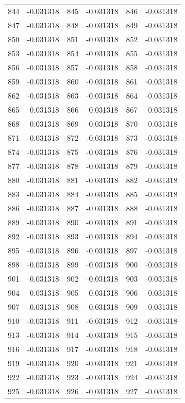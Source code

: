 \documentclass[12pt]{article}
\begin{document}
\begin{longtable}{@{}cc|cc|cc@{}}
844 & -0.031318 & 845 & -0.031318 & 846 & -0.031318 \\
847 & -0.031318 & 848 & -0.031318 & 849 & -0.031318 \\
850 & -0.031318 & 851 & -0.031318 & 852 & -0.031318 \\
853 & -0.031318 & 854 & -0.031318 & 855 & -0.031318 \\
856 & -0.031318 & 857 & -0.031318 & 858 & -0.031318 \\
859 & -0.031318 & 860 & -0.031318 & 861 & -0.031318 \\
862 & -0.031318 & 863 & -0.031318 & 864 & -0.031318 \\
865 & -0.031318 & 866 & -0.031318 & 867 & -0.031318 \\
868 & -0.031318 & 869 & -0.031318 & 870 & -0.031318 \\
871 & -0.031318 & 872 & -0.031318 & 873 & -0.031318 \\
874 & -0.031318 & 875 & -0.031318 & 876 & -0.031318 \\
877 & -0.031318 & 878 & -0.031318 & 879 & -0.031318 \\
880 & -0.031318 & 881 & -0.031318 & 882 & -0.031318 \\
883 & -0.031318 & 884 & -0.031318 & 885 & -0.031318 \\
886 & -0.031318 & 887 & -0.031318 & 888 & -0.031318 \\
889 & -0.031318 & 890 & -0.031318 & 891 & -0.031318 \\
892 & -0.031318 & 893 & -0.031318 & 894 & -0.031318 \\
895 & -0.031318 & 896 & -0.031318 & 897 & -0.031318 \\
898 & -0.031318 & 899 & -0.031318 & 900 & -0.031318 \\
901 & -0.031318 & 902 & -0.031318 & 903 & -0.031318 \\
904 & -0.031318 & 905 & -0.031318 & 906 & -0.031318 \\
907 & -0.031318 & 908 & -0.031318 & 909 & -0.031318 \\
910 & -0.031318 & 911 & -0.031318 & 912 & -0.031318 \\
913 & -0.031318 & 914 & -0.031318 & 915 & -0.031318 \\
916 & -0.031318 & 917 & -0.031318 & 918 & -0.031318 \\
919 & -0.031318 & 920 & -0.031318 & 921 & -0.031318 \\
922 & -0.031318 & 923 & -0.031318 & 924 & -0.031318 \\
925 & -0.031318 & 926 & -0.031318 & 927 & -0.031318 \\

\end{longtable}
\end{document}
